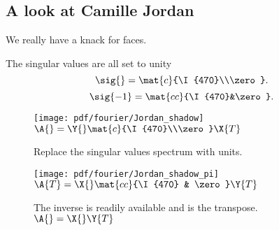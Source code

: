 \subsection{A look at Camille Jordan}
We really have a knack for faces.

The singular values are all set to unity
\begin{equation}
  \sig{} = \mat{c}{\I{470}\\\zero}.
\end{equation}
\begin{equation}
  \sig{-1} = \mat{cc}{\I{470}&\zero}.
\end{equation}


\begin{figure}[htbp] %
   \centering
   \texttt{[image: pdf/fourier/Jordan\_shadow]} \\[5pt]
   $\A{} = \Y{} \mat{c}{\I{470}\\\zero} \X{T}$
   \caption{Replace the singular values spectrum with units. }
   \label{fig:fourier:Hilbert:unit}
\end{figure}

\begin{figure}[htbp] %
   \centering
   \texttt{[image: pdf/fourier/Jordan\_shadow\_pi]}  \\[5pt]
   $\A{T} = \X{} \mat{cc}{\I{470} & \zero} \Y{T}$
   \caption{The inverse is readily available and is the transpose. $\A{} = \X{} \Y{T}$}
   \label{fig:fourier:Hilbert:pi}
\end{figure}

\clearpage

